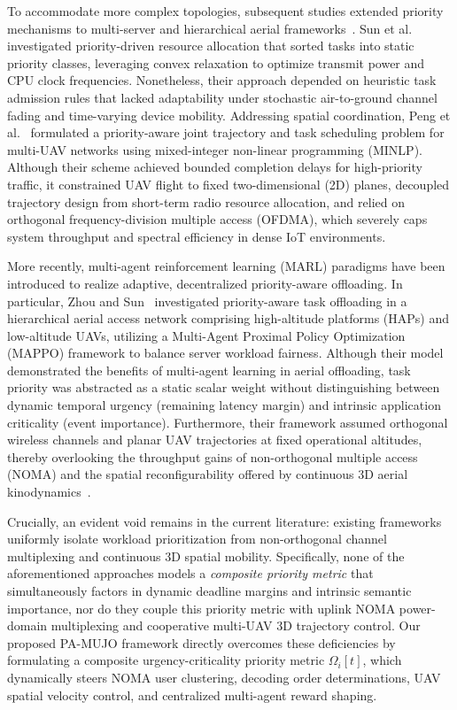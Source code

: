 \documentclass[journal]{IEEEtran}
\begin{document}
To accommodate more complex topologies, subsequent studies extended priority mechanisms to multi-server and hierarchical aerial frameworks~\cite{sun2023priority, peng2024priority}. Sun et al.~\cite{sun2023priority} investigated priority-driven resource allocation that sorted tasks into static priority classes, leveraging convex relaxation to optimize transmit power and CPU clock frequencies. Nonetheless, their approach depended on heuristic task admission rules that lacked adaptability under stochastic air-to-ground channel fading and time-varying device mobility. Addressing spatial coordination, Peng et al.~\cite{peng2024priority} formulated a priority-aware joint trajectory and task scheduling problem for multi-UAV networks using mixed-integer non-linear programming (MINLP). Although their scheme achieved bounded completion delays for high-priority traffic, it constrained UAV flight to fixed two-dimensional (2D) planes, decoupled trajectory design from short-term radio resource allocation, and relied on orthogonal frequency-division multiple access (OFDMA), which severely caps system throughput and spectral efficiency in dense IoT environments.

More recently, multi-agent reinforcement learning (MARL) paradigms have been introduced to realize adaptive, decentralized priority-aware offloading. In particular, Zhou and Sun~\cite{zhou2024priority} investigated priority-aware task offloading in a hierarchical aerial access network comprising high-altitude platforms (HAPs) and low-altitude UAVs, utilizing a Multi-Agent Proximal Policy Optimization (MAPPO) framework to balance server workload fairness. Although their model demonstrated the benefits of multi-agent learning in aerial offloading, task priority was abstracted as a static scalar weight without distinguishing between dynamic temporal urgency (remaining latency margin) and intrinsic application criticality (event importance). Furthermore, their framework assumed orthogonal wireless channels and planar UAV trajectories at fixed operational altitudes, thereby overlooking the throughput gains of non-orthogonal multiple access (NOMA) and the spatial reconfigurability offered by continuous 3D aerial kinodynamics~\cite{li2026tnse, 8937764}.

Crucially, an evident void remains in the current literature: existing frameworks uniformly isolate workload prioritization from non-orthogonal channel multiplexing and continuous 3D spatial mobility. Specifically, none of the aforementioned approaches models a \textit{composite priority metric} that simultaneously factors in dynamic deadline margins and intrinsic semantic importance, nor do they couple this priority metric with uplink NOMA power-domain multiplexing and cooperative multi-UAV 3D trajectory control. Our proposed PA-MUJO framework directly overcomes these deficiencies by formulating a composite urgency-criticality priority metric $\Omega_i[t]$, which dynamically steers NOMA user clustering, decoding order determinations, UAV spatial velocity control, and centralized multi-agent reward shaping.
\end{document}
